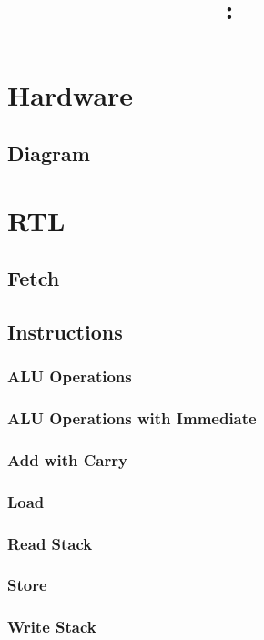 \documentclass{article}
\title{
	\vspace{2in}
	\textmd{\textbf{\hmwkClass:\ \hmwkTitle}}\\
	\vspace{3in}
}
\author{\hmwkAuthorName}
\date{}
\begin{document}
\maketitle

\pagebreak

\section{Hardware}

	\subsection{Diagram}

\section{RTL}

	\subsection{Fetch}
	
	\subsection{Instructions}

		\subsubsection{ALU Operations}
		\subsubsection{ALU Operations with Immediate}
		\subsubsection{Add with Carry}
		\subsubsection{Load}
		\subsubsection{Read Stack}
		\subsubsection{Store}
		\subsubsection{Write Stack}
\end{document}
